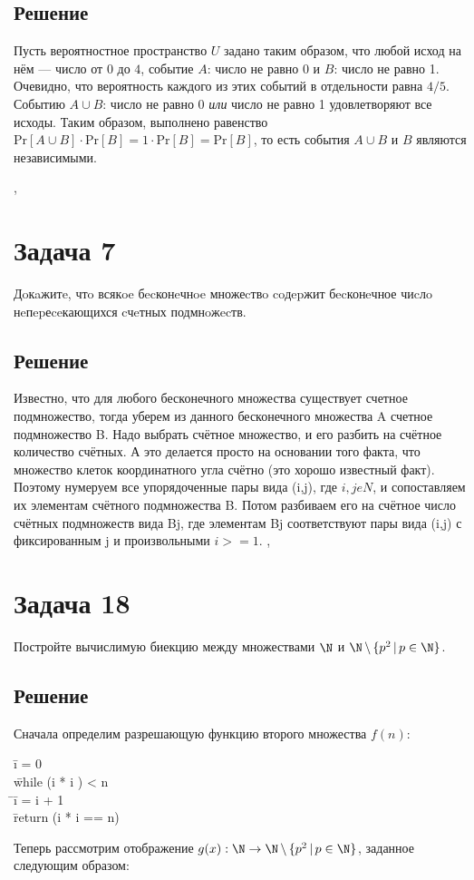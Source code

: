 \documentclass[a4paper,12pt]{article}
\newcommand {\gu} [1] {\guillemotleft#1\guillemotright}
\renewcommand{\Pr} {\text {Pr}}
\newcommand{\tab}{\quad\=}
\newenvironment{programm}{
    \ttfamily
    \begin{tabbing}
    }
    {
    \end{tabbing}
}
\begin{document}
	\subsection*{Решение}
	Пусть вероятностное пространство $U$ задано таким образом, что любой исход на нём --- число от $0$ до $4$, событие $A$: \gu{число не равно 0} и $B$: \gu{число не равно 1}. Очевидно, что вероятность каждого из этих событий в отдельности равна $4/5$. Событию $A\cup B$: \gu{число не равно 0 \textit{или} число не равно 1} удовлетворяют все исходы. Таким образом, выполнено равенство $\Pr [A\cup B]\cdot\Pr [B]=1\cdot\Pr [B] = \Pr[B]$, то есть события $A\cup B$ и $B$ являются независимыми.
	
	\sep
	\section*{Задача 7}
    
    Дoкaжитe, чтo всякoe бecконeчнoe множеcтвo coдepжит бecконeчное чиcлo нeпepеceкающихся cчeтных подмнoжecтв.
    
    \subsection*{Решение}
    Известно, что для любого бесконечного множества существует счетное подмножество, тогда уберем из данного бесконечного множества A счетное подмножество B.
    Надо выбрать счётное множество, и его разбить на счётное количество счётных. А это делается просто на основании того факта, что множество клеток координатного угла счётно (это хорошо известный факт). Поэтому нумеруем все упорядоченные пары вида (i,j), где $i,jeN$, и сопоставляем их элементам счётного подмножества B. Потом разбиваем его на счётное число счётных подмножеств вида Bj, где элементам Bj соответствуют пары вида (i,j) с фиксированным j и произвольными $i>=1$.
    \sep
	\section*{Задача 18}
	Постройте вычислимую биекцию между множествами $\N$ и $\N\,\backslash\,\{p^2\,|\,p\in\N\}$.
	\subsection*{Решение}
	Сначала определим разрешающую функцию второго множества $f(n)$:
    \begin{programm}
    \tab i = 0\\
    \tab while (i * i ) < n\\
    \tab\tab i = i + 1\\
    \tab return (i * i == n)
    \end{programm}
    Теперь рассмотрим отображение $g(x): \N\to\N\,\backslash\,\{p^2\,|\,p\in\N\}$, заданное следующим образом:
	
\end{document}
